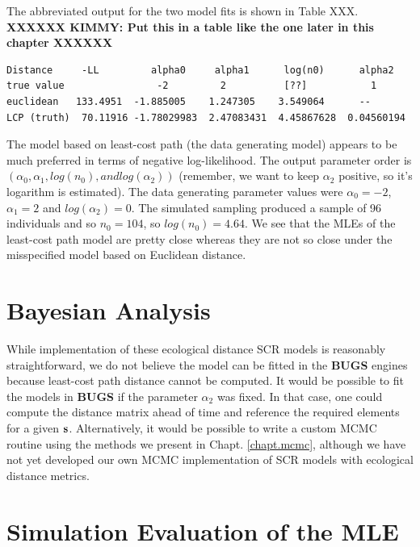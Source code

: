 The abbreviated output for the two model fits is shown in Table XXX.
{\bf XXXXXX KIMMY: Put this in a table like the one later in this chapter XXXXXX}
\begin{verbatim}
Distance     -LL         alpha0     alpha1      log(n0)      alpha2
true value                -2         2          [??]           1
euclidean   133.4951  -1.885005    1.247305    3.549064      --
LCP (truth)  70.11916 -1.78029983  2.47083431  4.45867628  0.04560194
\end{verbatim}



The model based on least-cost path (the data generating model) appears
to be much preferred in terms of negative log-likelihood.
The output parameter order is $(\alpha_{0}, \alpha_{1}, log(n_{0}), and
log(\alpha_{2}))$ (remember, we want to keep $\alpha_{2}$
positive, so it's logarithm is estimated). 
The data generating parameter values were
$\alpha_{0} = - 2$, 
$\alpha_{1} = 2$ and $log(\alpha_{2}) = 0$.
The simulated sampling produced a sample of 96 individuals and so
$n_{0} = 104$, so $log(n_{0}) = 4.64$. We see that the 
 MLEs of the least-cost path model are pretty close whereas they are
 not so close under the misspecified model based on Euclidean distance.






\section{Bayesian Analysis}

While implementation of these ecological distance SCR models is
reasonably straightforward, we do not believe the model can be fitted
in the  {\bf BUGS} engines because least-cost path distance cannot be computed.
It would be possible to fit the models
in {\bf BUGS} if the parameter $\alpha_{2}$ was fixed. In that case,
one could compute the distance matrix ahead of time and reference the
required elements for a given ${\bf s}$.
Alternatively, it would be possible to write a custom MCMC routine
using the methods we present in Chapt. \ref{chapt.mcmc}, although we
have not yet developed our own MCMC implementation of SCR models with
ecological distance metrics. 


\section{Simulation Evaluation of the MLE}

